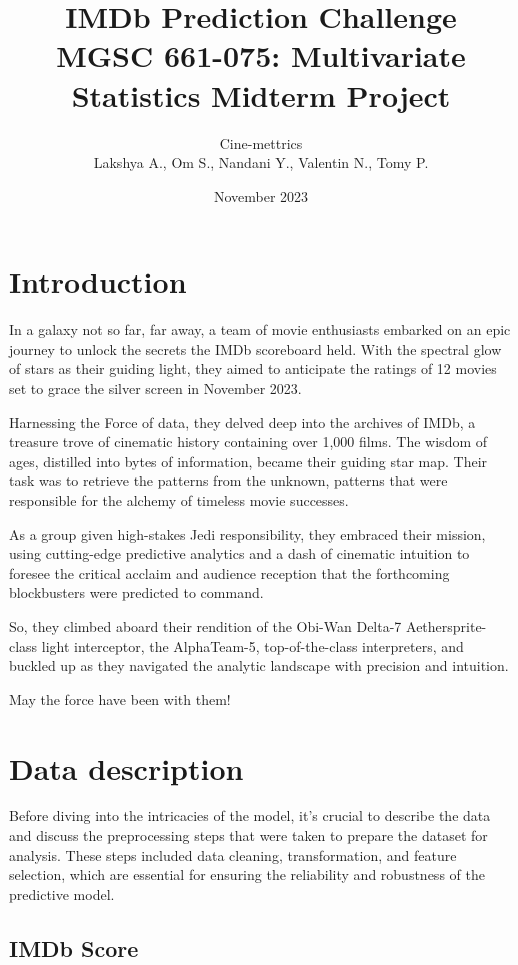 \documentclass[12pt,a4paper]{article}
\title{IMDb Prediction Challenge \\ \normalsize{MGSC 661-075: Multivariate Statistics Midterm Project}}
\author{Cine-mettrics \\ \normalsize{Lakshya A., Om S., Nandani Y., Valentin N., Tomy P.}}
\date{November 2023}
\begin{document}
\maketitle

\section{Introduction}\label{sec:intro}
In a galaxy not so far, far away, a team of movie enthusiasts embarked on an epic journey to unlock the secrets the IMDb scoreboard held.
With the spectral glow of stars as their guiding light, they aimed to anticipate the ratings of 12 movies set to grace the silver screen in November 2023.

Harnessing the Force of data, they delved deep into the archives of IMDb, a treasure trove of cinematic history containing over 1,000 films.
The wisdom of ages, distilled into bytes of information, became their guiding star map.
Their task was to retrieve the patterns from the unknown, patterns that were responsible for the alchemy of timeless movie successes.

As a group given high-stakes Jedi responsibility, they embraced their mission, using cutting-edge predictive analytics and a dash of cinematic intuition to foresee the critical acclaim and audience reception that the forthcoming blockbusters were predicted to command.

So, they climbed aboard their rendition of the Obi-Wan Delta-7 Aethersprite-class light interceptor, the AlphaTeam-5, top-of-the-class interpreters, and buckled up as they navigated the analytic landscape with precision and intuition.

May the force have been with them!

\section{Data description}\label{sec:data-description}
Before diving into the intricacies of the model, it's crucial to describe the data and discuss the
preprocessing steps that were taken to prepare the dataset for analysis.
These steps included data cleaning, transformation, and feature selection,
which are essential for ensuring the reliability and robustness of the predictive model.

\subsection{IMDb Score}\label{subsec:imdb-score}
\end{document}
